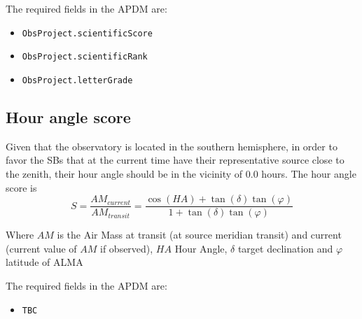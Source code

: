 \documentclass{article}
\begin{document}
The required fields in the APDM are:
\begin{itemize}
\item {\tt ObsProject.scientificScore} 
\item {\tt ObsProject.scientificRank} 
\item {\tt ObsProject.letterGrade} 
\end{itemize}

\subsection{Hour angle score}

Given that the observatory is located in the southern hemisphere, in order to favor the
SBs that at the current time have their representative source close to the zenith, 
their hour angle should be in the vicinity of 0.0 hours. The hour angle score is
$$
	S = \frac{AM_{current}}{AM_{transit}} = \frac{\cos(HA) + \tan(\delta) \tan(\varphi)}
											{1 + \tan(\delta) \tan(\varphi)}
$$

Where $AM$ is the Air Mass at transit (at source meridian transit) and current
(current value of $AM$ if observed), $HA$ Hour Angle, $\delta$ target declination
 and $\varphi$ latitude of ALMA

The required fields in the APDM are:
\begin{itemize}
\item {\tt TBC}
\end{itemize}
\end{document}
